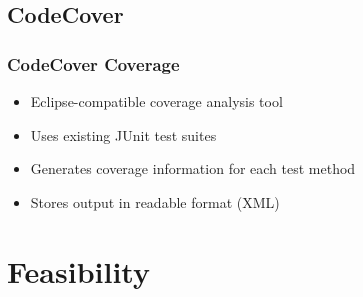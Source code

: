 \documentclass{beamer}
\begin{document}
	\subsection{CodeCover}
	\begin{frame}
	\frametitle{CodeCover Coverage}
	\begin{itemize}
    	\item Eclipse-compatible coverage analysis tool
    	\pause
    	\item Uses existing JUnit test suites
    	\pause
    	\item Generates coverage information for each test method
    	\pause
    	\item Stores output in readable format (XML)
	\end{itemize}
	\end{frame}
	\section{Feasibility}
\end{document}
